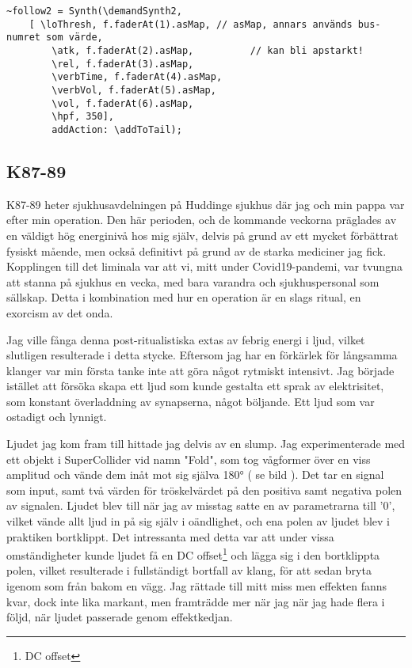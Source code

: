 \documentclass{article}
\renewcommand{\baselinestretch}{1.5}
\begin{document}
\renewcommand{\baselinestretch}{1}
\begin{lstlisting}[style=SuperCollider-IDE, caption=Syntens kontrollschema]
~follow2 = Synth(\demandSynth2, 
	[ \loThresh, f.faderAt(1).asMap, // asMap, annars används bus-numret som värde,
		\atk, f.faderAt(2).asMap,		   // kan bli apstarkt!
		\rel, f.faderAt(3).asMap,
		\verbTime, f.faderAt(4).asMap,
		\verbVol, f.faderAt(5).asMap,
		\vol, f.faderAt(6).asMap,
		\hpf, 350],
		addAction: \addToTail); 
\end{lstlisting}
\renewcommand{\baselinestretch}{1.5}

  \subsection{K87-89}
  K87-89 heter sjukhusavdelningen på Huddinge sjukhus där jag och min pappa var efter min operation. Den här
  perioden, och de kommande veckorna präglades av en väldigt hög energinivå hos mig själv, delvis på grund av
  ett mycket förbättrat fysiskt mående, men också definitivt på grund av de starka mediciner jag fick.
  Kopplingen till det liminala var att vi, mitt under Covid19-pandemi, var tvungna att stanna på sjukhus en
  vecka, med bara varandra och sjukhuspersonal som sällskap. Detta i kombination med hur en operation är en
  slags ritual, en exorcism av det onda. 

  Jag ville fånga denna post-ritualistiska extas av febrig energi i ljud, vilket slutligen resulterade i detta
  stycke. Eftersom jag har en förkärlek för långsamma klanger var min första tanke inte att göra något
  rytmiskt intensivt. Jag började istället att försöka skapa ett ljud som kunde gestalta ett sprak av
  elektrisitet, som konstant överladdning av synapserna, något böljande. Ett ljud som var ostadigt och
  lynnigt. 

  Ljudet jag kom fram till hittade jag delvis av en slump. Jag experimenterade med ett objekt i
  SuperCollider vid namn "Fold", som tog vågformer över en viss amplitud och vände dem inåt mot sig själva
  180° ( se bild ). Det tar en signal som input, samt två värden för tröskelvärdet på den positiva samt
  negativa polen av signalen. Ljudet blev till när jag av misstag satte en av parametrarna till '0', vilket
  vände allt ljud in på sig själv i oändlighet, och ena polen av ljudet blev i praktiken bortklippt. Det
  intressanta med detta var att under vissa omständigheter kunde ljudet få en DC offset\footnote{DC offset}
  och lägga sig i den bortklippta polen, vilket resulterade i fullständigt bortfall av klang, för att sedan
  bryta igenom som från bakom en vägg. Jag rättade till mitt miss men effekten fanns kvar, dock inte lika
  markant, men framträdde mer när jag när jag hade flera i följd, när ljudet passerade genom effektkedjan.
\end{document}
